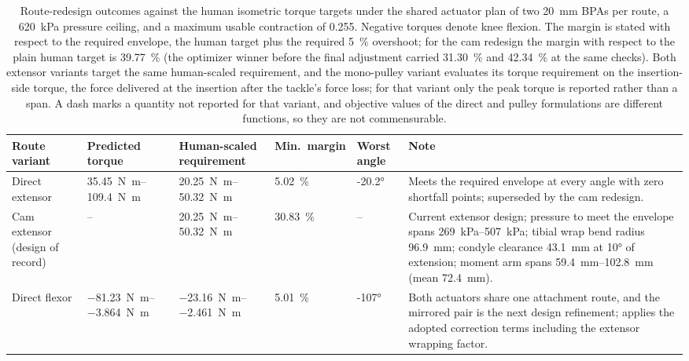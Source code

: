 \begin{table}[htbp]
\caption{Route-redesign outcomes against the human isometric torque targets under the shared actuator plan of two \qty{20}{\mm} BPAs per route, a \qty{620}{\kPa} pressure ceiling, and a maximum usable contraction of 0.255. Negative torques denote knee flexion. The margin is stated with respect to the required envelope, the human target plus the required \qty{5}{\percent} overshoot; for the cam redesign the margin with respect to the plain human target is \qty{+39.77}{\percent} (the optimizer winner before the final adjustment carried \qty{+31.30}{\percent} and \qty{+42.34}{\percent} at the same checks). Both extensor variants target the same human-scaled requirement, and the mono-pulley variant evaluates its torque requirement on the insertion-side torque, the force delivered at the insertion after the tackle's force loss; for that variant only the peak torque is reported rather than a span. A dash marks a quantity not reported for that variant, and objective values of the direct and pulley formulations are different functions, so they are not commensurable.}
\label{tab:Redesign}
\small
\begin{tabular}{@{}p{2.3cm}p{2.7cm}p{2.4cm}p{1.4cm}p{1.1cm}p{4.4cm}@{}}
\toprule
\textbf{Route variant} & \textbf{Predicted torque} & \textbf{Human-scaled requirement} & \textbf{Min.\ margin} & \textbf{Worst angle} & \textbf{Note} \\
\midrule
Direct extensor & \qtyrange{35.45}{109.4}{\newton\meter} & \qtyrange{20.25}{50.32}{\newton\meter} & \qty{+5.02}{\percent} & \ang{-20.2} & Meets the required envelope at every angle with zero shortfall points; superseded by the cam redesign. \\
Cam extensor (design of record) & -- & \qtyrange{20.25}{50.32}{\newton\meter} & \qty{+30.83}{\percent} & -- & Current extensor design; pressure to meet the envelope spans \qtyrange{269}{507}{\kPa}; tibial wrap bend radius \qty{96.9}{\mm}; condyle clearance \qty{43.1}{\mm} at \ang{10} of extension; moment arm spans \qtyrange{59.4}{102.8}{\mm} (mean \qty{72.4}{\mm}). \\
Direct flexor & \qtyrange{-81.23}{-3.864}{\newton\meter} & \qtyrange{-23.16}{-2.461}{\newton\meter} & \qty{+5.01}{\percent} & \ang{-107} & Both actuators share one attachment route, and the mirrored pair is the next design refinement; applies the adopted correction terms including the extensor wrapping factor. \\

\end{tabular}
\end{table}
